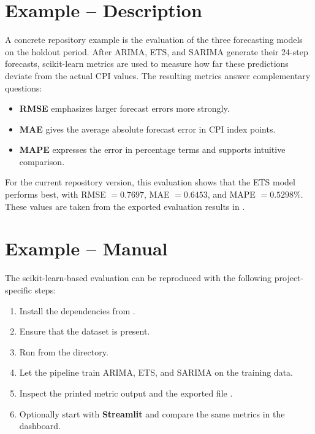 \section{Example -- Description}

A concrete repository example is the evaluation of the three forecasting models on the holdout period. After ARIMA, ETS, and SARIMA generate their 24-step forecasts, scikit-learn metrics are used to measure how far these predictions deviate from the actual CPI values. The resulting metrics answer complementary questions:

\begin{itemize}
	\item \textbf{RMSE} emphasizes larger forecast errors more strongly.
	\item \textbf{MAE} gives the average absolute forecast error in CPI index points.
	\item \textbf{MAPE} expresses the error in percentage terms and supports intuitive comparison.
\end{itemize}

For the current repository version, this evaluation shows that the ETS model performs best, with RMSE $= 0.7697$, MAE $= 0.6453$, and MAPE $= 0.5298\%$. These values are taken from the exported evaluation results in .

\section{Example -- Manual}

The scikit-learn-based evaluation can be reproduced with the following project-specific steps:

\begin{enumerate}
	\item Install the dependencies from .
	\item Ensure that the dataset  is present.
	\item Run  from the  directory.
	\item Let the pipeline train ARIMA, ETS, and SARIMA on the training data.
	\item Inspect the printed metric output and the exported file .
	\item Optionally start  with \textbf{Streamlit} and compare the same metrics in the dashboard.
\end{enumerate}

